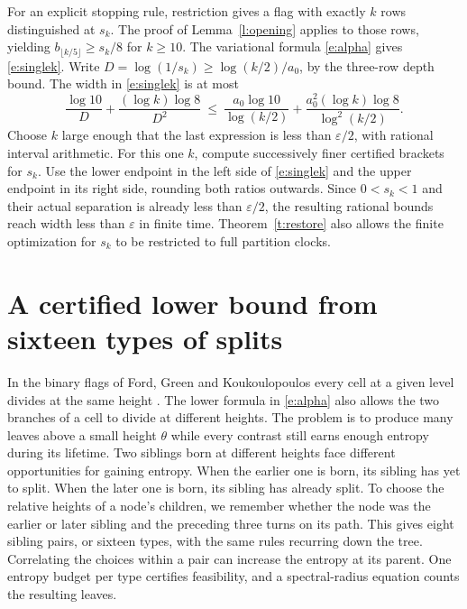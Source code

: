 \documentclass[11pt]{article}
\numberwithin{equation}{section}
\begin{document}
For an explicit stopping rule, restriction gives a flag with
exactly $k$ rows distinguished at $s_k$. The proof of
Lemma~\ref{l:opening} applies to those rows, yielding
$b_{\lfloor k/5\rfloor}\ge s_k/8$ for $k\ge10$.
The variational formula \eqref{e:alpha} gives \eqref{e:singlek}. Write
$D=\log(1/s_k)\ge\log(k/2)/a_0$, by the three-row depth bound.
The width in \eqref{e:singlek} is at most
\begin{equation}
 \frac{\log10}{D}+\frac{(\log k)\log8}{D^2}
 \ \le\
 \frac{a_0\log10}{\log(k/2)}
 +\frac{a_0^2(\log k)\log8}{\log^2(k/2)} .
 \label{e:width}
\end{equation}
Choose $k$ large enough that the last expression is less than
$\varepsilon/2$, with rational interval arithmetic. For this one
$k$, compute successively finer certified brackets for $s_k$.
Use the lower endpoint in the left side of \eqref{e:singlek}
and the upper endpoint in its right side, rounding both ratios
outwards. Since $0<s_k<1$ and their actual separation is already
less than $\varepsilon/2$, the resulting rational bounds reach
width less than $\varepsilon$ in finite time. Theorem~\ref{t:restore}
also allows the finite optimization for $s_k$ to be restricted to
full partition clocks.

\section{A certified lower bound from sixteen types of splits}
\label{nl:section}

In the binary flags of Ford, Green and Koukoulopoulos every cell
at a given level divides at the same height
\cite[Definition~3.8 and Sections~9--10]{fgk}. The lower formula
in \eqref{e:alpha} also allows the two branches of a cell to
divide at different heights. The problem is to produce many leaves
above a small height $\theta$ while every contrast still earns
enough entropy during its lifetime. Two siblings born at different heights face different
opportunities for gaining entropy. When the earlier one is born,
its sibling has yet to split. When the later one is born, its
sibling has already split. To choose the relative heights of a
node's children, we remember whether the node was the earlier or
later sibling and the preceding three turns on its path. This gives
eight sibling pairs, or sixteen types, with the same rules recurring
down the tree.
Correlating the choices within a pair can increase the entropy at
its parent. One entropy budget per type certifies feasibility,
and a spectral-radius equation counts the resulting leaves.
\end{document}
